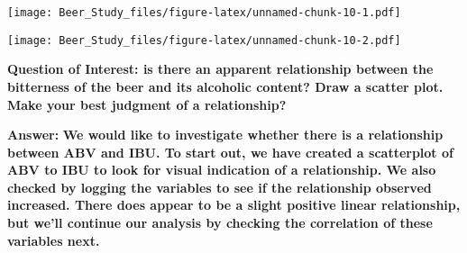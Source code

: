 \documentclass[
]{article}
\newenvironment{Shaded}{\begin{snugshade}}{\end{snugshade}}
\newcommand{\DataTypeTok}[1]{\textcolor[rgb]{0.13,0.29,0.53}{#1}}
\newcommand{\DecValTok}[1]{\textcolor[rgb]{0.00,0.00,0.81}{#1}}
\newcommand{\KeywordTok}[1]{\textcolor[rgb]{0.13,0.29,0.53}{\textbf{#1}}}
\newcommand{\NormalTok}[1]{#1}
\newcommand{\OperatorTok}[1]{\textcolor[rgb]{0.81,0.36,0.00}{\textbf{#1}}}
\newcommand{\OtherTok}[1]{\textcolor[rgb]{0.56,0.35,0.01}{#1}}
\newcommand{\StringTok}[1]{\textcolor[rgb]{0.31,0.60,0.02}{#1}}
\begin{document}
\texttt{[image: Beer\_Study\_files/figure-latex/unnamed-chunk-10-1.pdf]}

\begin{Shaded}
\end{Shaded}

\texttt{[image: Beer\_Study\_files/figure-latex/unnamed-chunk-10-2.pdf]}

\textbf{Question of Interest: is there an apparent relationship between
the bitterness of the beer and its alcoholic content? Draw a scatter
plot. Make your best judgment of a relationship?}

\textbf{Answer:} \textbf{We would like to investigate whether there is a
relationship between ABV and IBU. To start out, we have created a
scatterplot of ABV to IBU to look for visual indication of a
relationship. We also checked by logging the variables to see if the
relationship observed increased. There does appear to be a slight
positive linear relationship, but we'll continue our analysis by
checking the correlation of these variables next.}

\begin{Shaded}
\end{Shaded}
\end{document}
